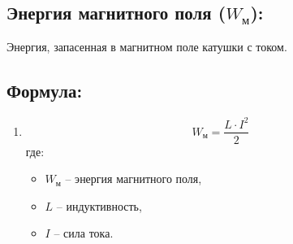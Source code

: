 \documentclass[a4paper,12pt]{article}
\begin{document}
\subsection*{Энергия магнитного поля ($W_м$):}
\vspace{-3pt}
Энергия, запасенная в магнитном поле катушки с током.

\vspace{-9pt}
\subsection*{Формула:}
\vspace{-3pt}
\begin{enumerate}[itemsep=0pt, topsep=0pt, parsep=3pt]
  \item 
  \vspace{-0.05em}
  $$ W_м = \frac{L \cdot I^2}{2} $$
  где:
  \begin{itemize}
    \item $W_м$ – энергия магнитного поля,
    \item $L$ – индуктивность,
    \item $I$ – сила тока.
  \end{itemize}
\end{enumerate}
\end{document}
